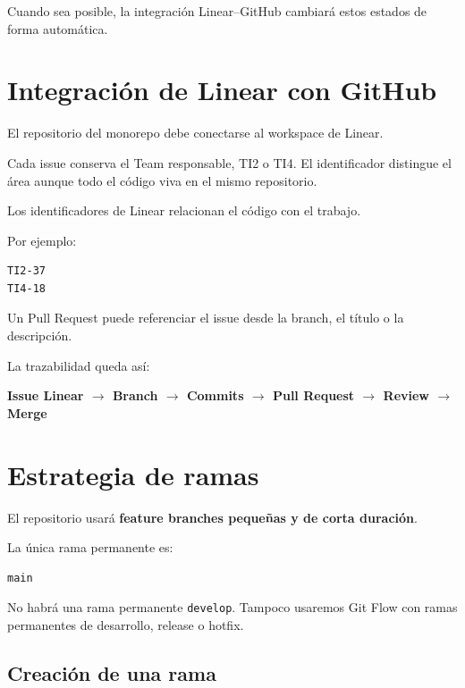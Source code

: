 \documentclass[11pt,a4paper]{article}
\begin{document}
Cuando sea posible, la integración Linear--GitHub cambiará estos estados de
forma automática.


\section{Integración de Linear con GitHub}

El repositorio del monorepo debe conectarse al workspace de Linear.

Cada issue conserva el Team responsable, TI2 o TI4. El identificador distingue
el área aunque todo el código viva en el mismo repositorio.

Los identificadores de Linear relacionan el código con el trabajo.

Por ejemplo:

\begin{lstlisting}
TI2-37
TI4-18
\end{lstlisting}

Un Pull Request puede referenciar el issue desde la branch, el título o la
descripción.

La trazabilidad queda así:

\begin{center}
  \textbf{
    Issue Linear
    $\rightarrow$
    Branch
    $\rightarrow$
    Commits
    $\rightarrow$
    Pull Request
    $\rightarrow$
    Review
    $\rightarrow$
    Merge
  }
\end{center}


\section{Estrategia de ramas}

El repositorio usará \textbf{feature branches pequeñas y de corta duración}.

La única rama permanente es:

\begin{lstlisting}
main
\end{lstlisting}

No habrá una rama permanente \texttt{develop}. Tampoco usaremos Git Flow con
ramas permanentes de desarrollo, release o hotfix.

\subsection{Creación de una rama}
\end{document}
